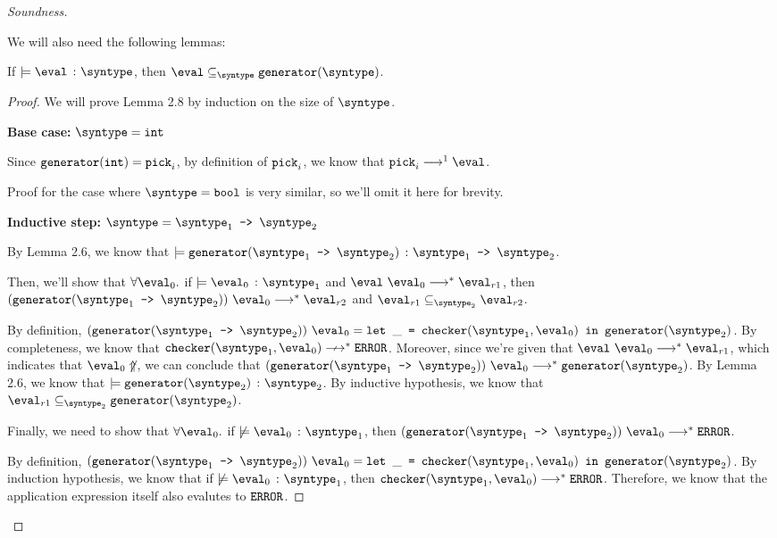 \begin{proof}[Soundness]
\begin{definition}
  \end{definition}

  We will also need the following lemmas:

  \begin{lemma}
    If $\models \hastype{\eval}{\syntype}$, then $\eval \subseteq_{\syntype} \mkgen{\syntype}$.
  \end{lemma}

  \begin{proof}
    We will prove Lemma 2.8 by induction on the size of $\syntype$.

    \textbf{Base case: }$\syntype = \tint$

    Since $\texttt{generator}(\texttt{int}) = \texttt{pick}_i$, by definition of $\texttt{pick}_i$, we know that $\pick_i \smallstep[] \eval$.

    Proof for the case where $\syntype = \tbool$ is very similar, so we'll omit it here for brevity.

    \textbf{Inductive step: }$\syntype = \mkfun{\syntype_1}{\syntype_2}$

    By Lemma 2.6, we know that $\models \hastype{\mkgen{\mkfun{\syntype_1}{\syntype_2}}}{\mkfun{\syntype_1}{\syntype_2}}$. 
    
    Then, we'll show that $\forall \eval_0. $ if $\models \hastype{\eval_0}{\syntype_1}$ and $\eval \ \eval_0 \smallsteps[] \eval_{r1}$, then $(\mkgen{\mkfun{\syntype_1}{\syntype_2}}) \ \eval_0 \smallsteps[] \eval_{r2}$ and $\eval_{r1} \subseteq_{\syntype_2} \eval_{r2}$.

    By definition, $(\mkgen{\mkfun{\syntype_1}{\syntype_2}}) \ \eval_0 = \letin{\_}{\mkche{\syntype_1}{\eval_0}}{\mkgen{\syntype_2}}$. By completeness, we know that $\mkche{\syntype_1}{\eval_0} \nsmallsteps[] \eerror$. Moreover, since we're given that $\eval \ \eval_0 \smallsteps[] \eval_{r1}$, which indicates that $\eval_0 \not\Uparrow$, we can conclude that $(\mkgen{\mkfun{\syntype_1}{\syntype_2}}) \ \eval_0 \smallsteps[] \mkgen{\syntype_2}$. By Lemma 2.6, we know that $\models \hastype{\mkgen{\syntype_2}}{\syntype_2}$. By inductive hypothesis, we know that $\eval_{r1} \subseteq_{\syntype_2} \mkgen{\syntype_2}$.

    Finally, we need to show that $\forall \eval_0. $ if $\not \models \hastype{\eval_0}{\syntype_1}$, then $(\mkgen{\mkfun{\syntype_1}{\syntype_2}}) \ \eval_0 \smallsteps[] \eerror$. 
    
    By definition, $(\mkgen{\mkfun{\syntype_1}{\syntype_2}}) \ \eval_0 = \letin{\_}{\mkche{\syntype_1}{\eval_0}}{\mkgen{\syntype_2}}$. By induction hypothesis, we know that if $\not \models \hastype{\eval_0}{\syntype_1}$, then ${\mkche{\syntype_1}{\eval_0}} \smallsteps[] \eerror$. Therefore, we know that the application expression itself also evalutes to $\texttt{ERROR}$.
  \end{proof}


\end{proof}
